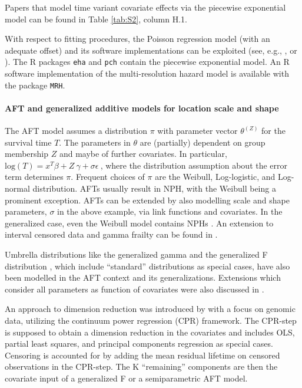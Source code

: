 \noindent Papers that model time variant covariate effects via the piecewise exponential model can be found in Table \ref{tab:S2}, column H.1.


\noindent With respect to fitting procedures, the Poisson regression model (with an adequate offset) and its software implementations can be exploited (see, e.g., \cite{Holford.1980}, \cite{Argyropoulos.2015} or \cite{RodriguezGirondo.2013}). 
The R packages \texttt{eha} and \texttt{pch} contain the piecewise exponential model.
An R software implementation of the multi-resolution hazard model is available with the package \texttt{MRH}.

\noindent 


\paragraph{AFT and generalized additive models for location scale and shape} \label{AFT}

\noindent 


\noindent The AFT model assumes a distribution $\pi$ with parameter vector ${\theta }^{\left(Z\right)}$ for the survival time $T$. The parameters in $\theta $ are (partially) dependent on group membership $Z$ and maybe of further covariates. In particular, ${\mathrm{log} \left(T\right)=x^T\beta +Z\ \gamma +\sigma \epsilon \ }$, where the distribution assumption about the error term determines $\pi $. Frequent choices of $\pi $ are the Weibull, Log-logistic, and Log-normal distribution. AFTs usually result in NPH, with the Weibull being a prominent exception. AFTs can be extended by also modelling scale and shape parameters, $\sigma$ in the above example, via link functions and covariates. In the generalized case, even the Weibull model contains NPHs \cite{Burke.2017}. An extension to interval censored data and gamma frailty can be found in \cite{Peng.2020}.

\noindent Umbrella distributions like the generalized gamma \cite{Cox.2007} and the generalized F distribution \cite{Kalbfleisch.2002}, which include ``standard'' distributions as special cases, have also been modelled in the AFT context and its generalizations. Extensions which consider all parameters as function of covariates were also discussed in \cite{Phadnis.2017}. 

\noindent An approach to dimension reduction was introduced by \cite{SpirkoBurns.2021} with a focus on genomic data, utilizing the continuum power regression (CPR) framework. The CPR-step is supposed to obtain a dimension reduction in the covariates and includes OLS, partial least squares, and principal components regression as special cases. Censoring is accounted for by adding the mean residual lifetime on censored observations in the CPR-step. The K ``remaining'' components are then the covariate input of a generalized F or a semiparametric AFT model.  


